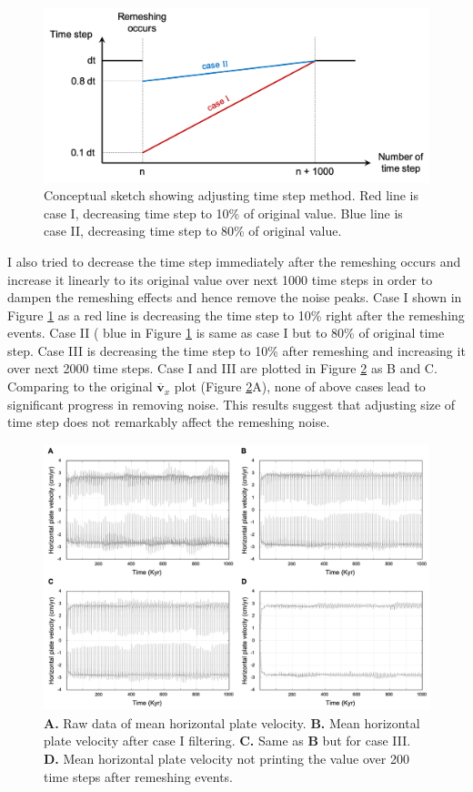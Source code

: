 \documentclass[letterpaper,12pt,notitle]{memphisthesis}                     %
\begin{document}
\begin{figure}[!htb]
	\centering
	\includegraphics[width=0.8\linewidth]{./figs/dtadjust.png}
	\caption{Conceptual sketch showing adjusting time step method. Red line is case I, decreasing time step to 10\% of original value. Blue line is case II, decreasing time step to 80\% of original value.}
	\label{fig:dtadj}
\end{figure}
%
I also tried to decrease the time step immediately after the remeshing occurs and increase it linearly to its original value over next 1000 time steps in order to dampen the remeshing effects and hence remove the noise peaks. Case I shown in Figure \ref{fig:dtadj} as a red line is decreasing the time step to 10\% right after the remeshing events. Case II ( blue in Figure \ref{fig:dtadj} is same as case I but to 80\% of original time step. Case III is decreasing the time step to 10\% after remeshing and increasing it over next 2000 time steps. Case I and III are plotted in Figure \ref{fig:remeshing} as B and C.
Comparing to the original $\overline{\boldsymbol{v}}_{x}$ plot (Figure \ref{fig:remeshing}A), none of above cases lead to significant progress in removing noise. This results suggest that adjusting size of time step does not remarkably affect the remeshing noise. 
\begin{figure}[!htb]
	\centering
	\includegraphics[width=0.98\linewidth]{./figs/remeshing.png}
	\caption{\textbf{A.} Raw data of mean horizontal plate velocity. \textbf{B.} Mean horizontal plate velocity after case I filtering. \textbf{C.} Same as \textbf{B} but for case III. \textbf{D.} Mean horizontal plate velocity not printing the value over 200 time steps after remeshing events.}
	\label{fig:remeshing}
\end{figure}
\end{document}
